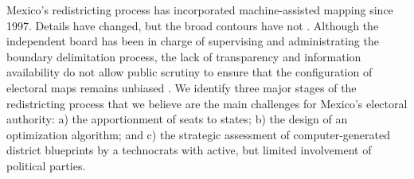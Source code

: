 \documentclass[letter,12pt]{article}
\begin{document}
Mexico's redistricting process has incorporated machine-assisted mapping since 1997. Details have changed, but the broad contours have not \citep{trelles.mtz.tesisItam.2007}. Although the independent board has been in charge of supervising and administrating the boundary delimitation process, the lack of transparency and information availability do not allow public scrutiny to ensure that the configuration of electoral maps remains unbiased \citep{trelles.datosabiertos.2015}. We identify three major stages of the redistricting process that we believe are the main challenges for Mexico's electoral authority: a) the apportionment of seats to states; b) the design of an optimization algorithm; and c) the strategic assessment of computer-generated district blueprints by a technocrats with active, but limited involvement of political parties.



\end{document}
